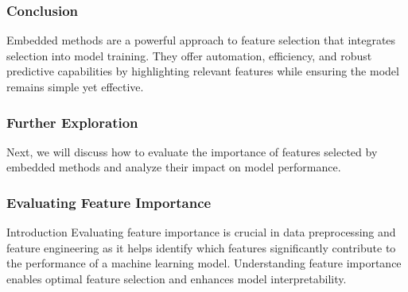 \documentclass[aspectratio=169]{beamer}
\begin{document}
\begin{frame}[fragile]
    \frametitle{Conclusion}
    Embedded methods are a powerful approach to feature selection that integrates selection into model training. They offer automation, efficiency, and robust predictive capabilities by highlighting relevant features while ensuring the model remains simple yet effective.
\end{frame}

\begin{frame}[fragile]
    \frametitle{Further Exploration}
    Next, we will discuss how to evaluate the importance of features selected by embedded methods and analyze their impact on model performance.
\end{frame}

\begin{frame}
    \frametitle{Evaluating Feature Importance}
    \begin{block}{Introduction}
        Evaluating feature importance is crucial in data preprocessing and feature engineering as it helps identify which features significantly contribute to the performance of a machine learning model. Understanding feature importance enables optimal feature selection and enhances model interpretability.
    \end{block}
\end{frame}
\end{document}
